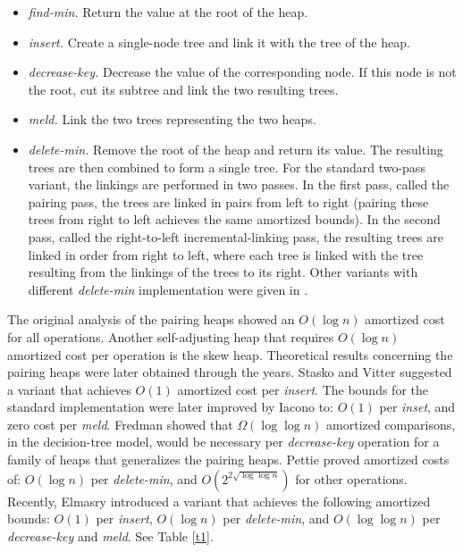 \begin{itemize}
\item{\it find-min.} Return the value at the root of the heap.
\item {\it insert.} Create a single-node tree and link it with the tree of the heap.
\item {\it decrease-key.} Decrease the value of the corresponding node. If this node is not the root, cut its subtree and link the two resulting trees.
\item{\it meld.} Link the two trees representing the two heaps.
\item {\it delete-min.} Remove the root of the heap and return its value. The resulting trees are then combined to form a single tree. For the standard two-pass variant, the linkings are performed in two passes. In the first pass, called the pairing pass, the trees are linked in pairs from left to right (pairing these trees from right to left achieves the same amortized bounds). In the second pass, called the right-to-left incremental-linking pass, the resulting trees are linked in order from right to left, where each tree is linked with the tree resulting from the linkings of the trees to its right.
Other variants with different {\it delete-min} implementation were given in \cite{e, f1, fsst}.
\end{itemize}


The original analysis of the pairing heaps \cite{fsst} showed an $O(\log{n})$ amortized cost for all operations.
Another self-adjusting heap that requires $O(\log{n})$ amortized cost per operation \cite{st2} is the skew heap. 
Theoretical results concerning the pairing heaps were later obtained through the years.
Stasko and Vitter \cite{sv} suggested a variant that achieves $O(1)$ amortized cost per {\it insert}. 
The bounds for the standard implementation were later improved by Iacono \cite{ia} to: $O(1)$ per {\it inset}, and zero cost per {\it meld}. 
Fredman \cite{f} showed that $\Omega(\log \log{n})$ amortized comparisons, in the decision-tree model, would be necessary per {\it decrease-key} operation for a family of heaps that generalizes the pairing heaps. Pettie \cite{p} proved amortized costs of: $O(\log{n})$ per {\it delete-min}, and $O(2^{2 \sqrt{\log \log n}})$ for other operations. Recently, Elmasry \cite{elm0} introduced a variant that achieves the following amortized bounds: $O(1)$ per {\it insert}, $O(\log{n})$ per {\it delete-min}, and $O(\log \log{n})$ per {\it decrease-key} and {\it meld}. See Table \ref{t1}.


